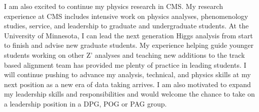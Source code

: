 \documentclass[11pt]{article}
\begin{document}



I am also excited to continue my physics research in CMS. My research experience at CMS includes intensive work on physics analyses, phenomenology studies, service, and leadership to graduate and undergraduate students. At the University of Minnesota, I can lead the next generation Higgs analysis from start to finish and advise new graduate students. My experience helping guide younger students working on other Z' analyses and teaching new additions to the track based alignment team has provided me plenty of practice in leading students. I will continue pushing to advance my analysis, technical, and physics skills at my next position as a new era of data taking arrives. I am also  motivated to expand my leadership skills and responsibilities and would welcome the chance to take on a leadership position in a DPG, POG or PAG group.

\end{document}
